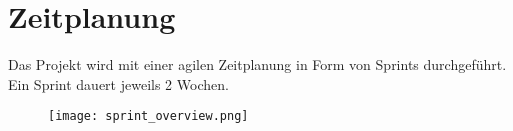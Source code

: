 \section{Zeitplanung}
    Das Projekt wird mit einer agilen Zeitplanung in Form von Sprints durchgeführt. Ein Sprint dauert jeweils 2 Wochen.
    \begin{figure}[H]%
        \centering
        \texttt{[image: sprint\_overview.png]}
    \end{figure}

